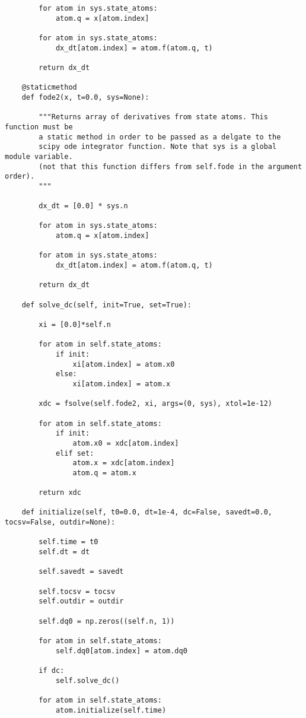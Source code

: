 \begin{lstlisting}
        for atom in sys.state_atoms:
            atom.q = x[atom.index]

        for atom in sys.state_atoms:
            dx_dt[atom.index] = atom.f(atom.q, t)

        return dx_dt

    @staticmethod
    def fode2(x, t=0.0, sys=None):

        """Returns array of derivatives from state atoms. This function must be
        a static method in order to be passed as a delgate to the
        scipy ode integrator function. Note that sys is a global module variable.
        (not that this function differs from self.fode in the argument order).
        """

        dx_dt = [0.0] * sys.n

        for atom in sys.state_atoms:
            atom.q = x[atom.index]

        for atom in sys.state_atoms:
            dx_dt[atom.index] = atom.f(atom.q, t)

        return dx_dt

    def solve_dc(self, init=True, set=True):

        xi = [0.0]*self.n

        for atom in self.state_atoms:
            if init:
                xi[atom.index] = atom.x0
            else:
                xi[atom.index] = atom.x

        xdc = fsolve(self.fode2, xi, args=(0, sys), xtol=1e-12)

        for atom in self.state_atoms:
            if init:
                atom.x0 = xdc[atom.index]
            elif set:
                atom.x = xdc[atom.index]
                atom.q = atom.x

        return xdc

    def initialize(self, t0=0.0, dt=1e-4, dc=False, savedt=0.0, tocsv=False, outdir=None):

        self.time = t0
        self.dt = dt

        self.savedt = savedt

        self.tocsv = tocsv
        self.outdir = outdir

        self.dq0 = np.zeros((self.n, 1))

        for atom in self.state_atoms:
            self.dq0[atom.index] = atom.dq0

        if dc:
            self.solve_dc()

        for atom in self.state_atoms:
            atom.initialize(self.time)


\end{lstlisting}
